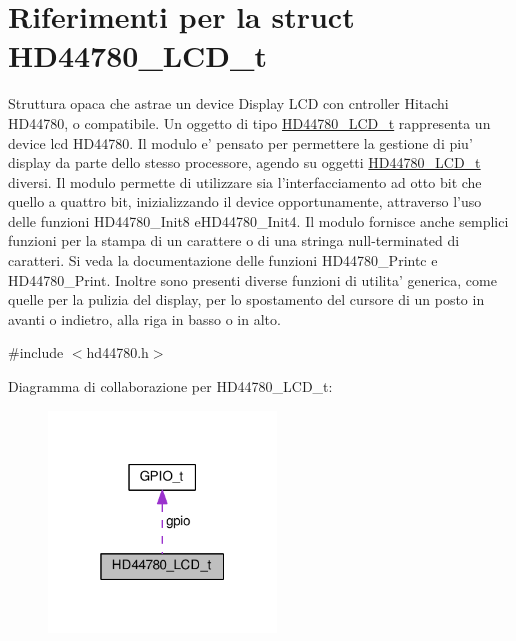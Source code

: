 \hypertarget{struct_h_d44780___l_c_d__t}{\section{Riferimenti per la struct H\+D44780\+\_\+\+L\+C\+D\+\_\+t}
\label{struct_h_d44780___l_c_d__t}
}


Struttura opaca che astrae un device Display L\+C\+D con cntroller Hitachi H\+D44780, o compatibile. Un oggetto di tipo \hyperlink{struct_h_d44780___l_c_d__t}{H\+D44780\+\_\+\+L\+C\+D\+\_\+t} rappresenta un device lcd H\+D44780. Il modulo e' pensato per permettere la gestione di piu' display da parte dello stesso processore, agendo su oggetti \hyperlink{struct_h_d44780___l_c_d__t}{H\+D44780\+\_\+\+L\+C\+D\+\_\+t} diversi. Il modulo permette di utilizzare sia l'interfacciamento ad otto bit che quello a quattro bit, inizializzando il device opportunamente, attraverso l'uso delle funzioni H\+D44780\+\_\+\+Init8 e\+H\+D44780\+\_\+\+Init4. Il modulo fornisce anche semplici funzioni per la stampa di un carattere o di una stringa null-\/terminated di caratteri. Si veda la documentazione delle funzioni H\+D44780\+\_\+\+Printc e H\+D44780\+\_\+\+Print. Inoltre sono presenti diverse funzioni di utilita' generica, come quelle per la pulizia del display, per lo spostamento del cursore di un posto in avanti o indietro, alla riga in basso o in alto.  




{\ttfamily \#include $<$hd44780.\+h$>$}



Diagramma di collaborazione per H\+D44780\+\_\+\+L\+C\+D\+\_\+t\+:
\nopagebreak
\begin{figure}[H]
\begin{center}
\leavevmode
\includegraphics[width=172pt]{struct_h_d44780___l_c_d__t__coll__graph}
\end{center}
\end{figure}
